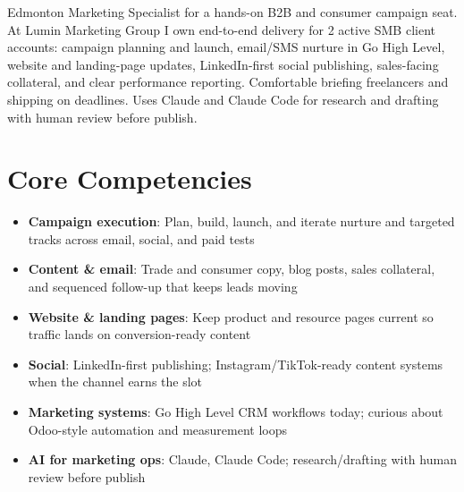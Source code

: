 \documentclass[11pt,a4paper,sans]{moderncv}
\begin{document}
\makecvtitle

\vspace{6pt}
\small{Edmonton Marketing Specialist for a hands-on B2B and consumer campaign seat. At Lumin Marketing Group I own end-to-end delivery for 2 active SMB client accounts: campaign planning and launch, email/SMS nurture in Go High Level, website and landing-page updates, LinkedIn-first social publishing, sales-facing collateral, and clear performance reporting. Comfortable briefing freelancers and shipping on deadlines. Uses Claude and Claude Code for research and drafting with human review before publish.}

\section{Core Competencies}
\vspace{1pt}
\begin{itemize}
\item \textbf{Campaign execution}: Plan, build, launch, and iterate nurture and targeted tracks across email, social, and paid tests
\item \textbf{Content \& email}: Trade and consumer copy, blog posts, sales collateral, and sequenced follow-up that keeps leads moving
\item \textbf{Website \& landing pages}: Keep product and resource pages current so traffic lands on conversion-ready content
\item \textbf{Social}: LinkedIn-first publishing; Instagram/TikTok-ready content systems when the channel earns the slot
\item \textbf{Marketing systems}: Go High Level CRM workflows today; curious about Odoo-style automation and measurement loops
\item \textbf{AI for marketing ops}: Claude, Claude Code; research/drafting with human review before publish
\end{itemize}
\end{document}
